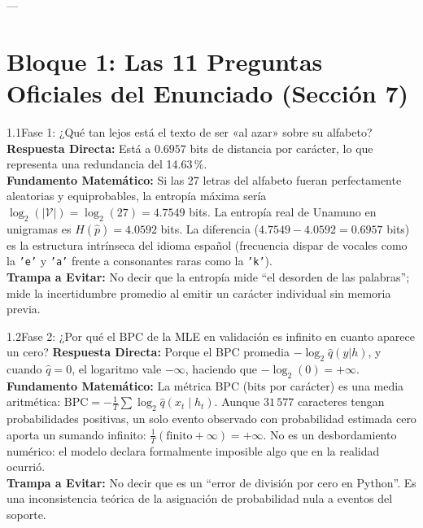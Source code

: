 \documentclass[11pt,letterpaper]{article}
\begin{document}
---

\section{Bloque 1: Las 11 Preguntas Oficiales del Enunciado (Sección 7)}

\begin{qbox}{1.1}{Fase 1: ¿Qué tan lejos está el texto de ser «al azar» sobre su alfabeto?}
\textbf{Respuesta Directa:} Está a $0.6957$ bits de distancia por carácter, lo que representa una redundancia del 14.63\,\%.\\[3pt]
\textbf{Fundamento Matemático:} Si las 27 letras del alfabeto fueran perfectamente aleatorias y equiprobables, la entropía máxima sería $\log_2(|\mathcal{V}|) = \log_2(27) = 4.7549$ bits. La entropía real de Unamuno en unigramas es $H(\hat{p}) = 4.0592$ bits. La diferencia ($4.7549 - 4.0592 = 0.6957$ bits) es la estructura intrínseca del idioma español (frecuencia dispar de vocales como la \texttt{'e'} y \texttt{'a'} frente a consonantes raras como la \texttt{'k'}).\\[3pt]
\textbf{Trampa a Evitar:} No decir que la entropía mide ``el desorden de las palabras''; mide la incertidumbre promedio al emitir un carácter individual sin memoria previa.
\end{qbox}

\begin{qbox}{1.2}{Fase 2: ¿Por qué el BPC de la MLE en validación es infinito en cuanto aparece un cero?}
\textbf{Respuesta Directa:} Porque el BPC promedia $-\log_2 \hat{q}(y|h)$, y cuando $\hat{q}=0$, el logaritmo vale $-\infty$, haciendo que $-\log_2(0) = +\infty$.\\[3pt]
\textbf{Fundamento Matemático:} La métrica BPC (bits por carácter) es una media aritmética: $\text{BPC} = -\frac{1}{T}\sum \log_2 \hat{q}(x_t \mid h_t)$. Aunque $31\,577$ caracteres tengan probabilidades positivas, un solo evento observado con probabilidad estimada cero aporta un sumando infinito: $\frac{1}{T}(\text{finito} + \infty) = +\infty$. No es un desbordamiento numérico: el modelo declara formalmente imposible algo que en la realidad ocurrió.\\[3pt]
\textbf{Trampa a Evitar:} No decir que es un ``error de división por cero en Python''. Es una inconsistencia teórica de la asignación de probabilidad nula a eventos del soporte.
\end{qbox}
\end{document}
